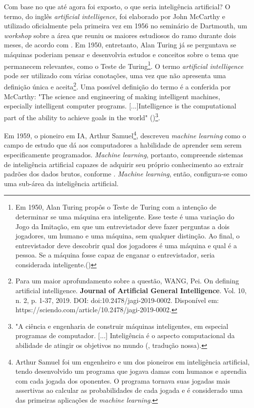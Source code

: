 Com base no que até agora foi exposto, o que seria inteligência artificial? O termo, do
inglês \textit{artificial intelligence}, foi elaborado por John McCarthy e utilizado 
oficialmente pela primeira vez em 1956 no seminário de 
Dartmouth, um \textit{workshop} sobre a área que reuniu os 
maiores estudiosos do ramo durante dois meses, de acordo com \cite{aima}.
Em 1950, entretanto, Alan Turing já se perguntava se máquinas 
poderiam pensar e desenvolvia estudos e conceitos sobre o tema que permanecem relevantes,
como o Teste de Turing\footnote{Em 1950, Alan Turing propôs o 
Teste de Turing com a intenção de determinar se uma máquina era inteligente. Esse teste é uma variação 
do Jogo da Imitação, em que um entrevistador deve fazer perguntas a dois jogadores, um 
humano e uma máquina, sem qualquer distinção. Ao final, o entrevistador deve
descobrir qual dos jogadores é uma máquina e qual é a pessoa. Se 
a máquina fosse capaz de enganar o entrevistador, seria considerada
inteligente.(\cite{turing})}.
O termo \textit{artificial intelligence} 
pode ser utilizado com
várias conotações, uma vez que não apresenta uma definição 
única e aceita\footnote{Para um maior aprofundamento sobre a questão, WANG, Pei. On defining artificial intelligence. \textbf{Journal of Artificial General Intelligence}. Vol. 10, n. 2, p. 1-37, 2019. DOI: doi:10.2478/jagi-2019-0002. Disponível em: https://sciendo.com/article/10.2478/jagi-2019-0002. }. Uma possível definição do termo é a conferida por McCarthy: "The science and engineering of making intelligent machines, especially intelligent computer programs. [...]Intelligence is the computational part of the ability to achieve goals in the world" (\citealt[][p.2]{what-is-ai})\footnote{"A ciência e engenharia de construir máquinas inteligentes, em especial programas de computador. [...] Inteligência é o aspecto computacional da abilidade de atingir os objetivos no mundo (\citealt[][p.2]{what-is-ai}, tradução nossa).}.

Em 1959, o pioneiro em IA, Arthur Samuel\footnote{Arthur Samuel
foi um engenheiro e um dos pioneiros em inteligência artificial,
tendo desenvolvido um programa que jogava damas com humanos e aprendia
com cada jogada dos oponentes. O programa tornava suas jogadas mais 
assertivas ao calcular as probabilidades de cada jogada e é 
considerado uma das primeiras aplicações de \textit{machine learning}.
}, descreveu 
\textit{machine learning} como o campo de estudo que dá aos 
computadores a habilidade de aprender sem serem especificamente
programados. \textit{Machine learning}, 
portanto, compreende sistemas de inteligência 
artificial capazes de adquirir seu próprio conhecimento 
ao extrair padrões dos dados brutos, conforme \citet{Goodfellow-et-al-2016}.
\textit{Machine learning}, então, configura-se como uma 
sub-área da inteligência artificial.


